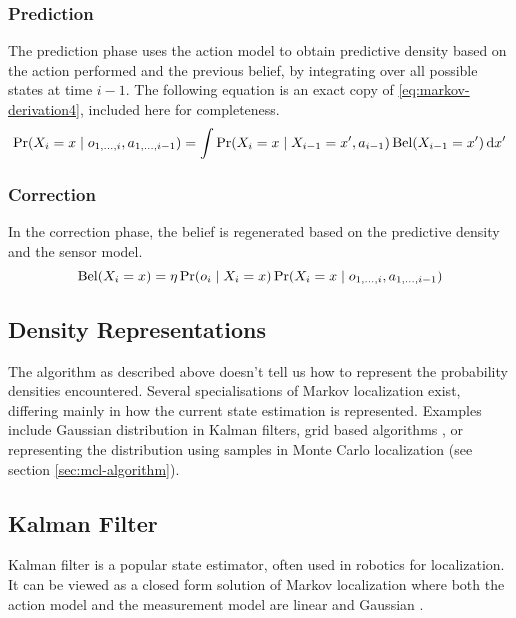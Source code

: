 \subsubsection{Prediction}
The prediction phase uses the action model to obtain predictive density based on the action performed
and the previous belief, by integrating over all possible states at time \(i - 1\).
The following equation is an exact copy of \eqref{eq:markov-derivation4}, included here for completeness.
\begin{equation}
	\label{eq:markov-prediction}
	\operatorname{\mathrm{Pr}}(X_i = x \mid o_{1, \dotsc, i}, a_{1, \dotsc, i - 1}) =
	\int
	\operatorname{\mathrm{Pr}}(X_i = x \mid X_{i - 1}=x', a_{i - 1})
	\operatorname{\mathrm{Bel}}(X_{i-1} = x')
	\,\mathrm{d}x'
\end{equation}

\subsubsection{Correction}
In the correction phase, the belief is regenerated based on the predictive density
and the sensor model.
\begin{equation}
	\label{eq:markov-correction}
	\operatorname{\mathrm{Bel}}(X_i = x) =
	\eta \operatorname{\mathrm{Pr}}(o_i \mid X_i = x)
	\operatorname{\mathrm{Pr}}(X_i = x \mid o_{1, \dotsc, i}, a_{1, \dotsc, i - 1})
\end{equation}

\subsection{Density Representations}
The algorithm as described above doesn't tell us how to represent the probability
densities encountered.
Several specialisations of Markov localization exist, differing mainly in how the
current state estimation is represented.
Examples include Gaussian distribution in Kalman filters,
grid based algorithms \cite{fox98}, or representing the distribution
using samples in Monte Carlo localization (see section \ref{sec:mcl-algorithm}).

\subsection{Kalman Filter}
\label{sec:kalman}
Kalman filter \cite{kalman60,welch95} is a popular state estimator, often used in robotics
for localization.
It can be viewed as a closed form solution of Markov localization where both the
action model and the measurement model are linear and Gaussian \cite{diard03}.

